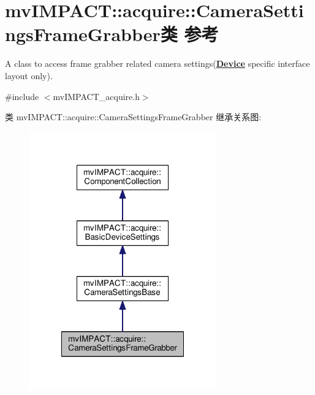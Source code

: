 \hypertarget{classmv_i_m_p_a_c_t_1_1acquire_1_1_camera_settings_frame_grabber}{\section{mv\+I\+M\+P\+A\+C\+T\+:\+:acquire\+:\+:Camera\+Settings\+Frame\+Grabber类 参考}
\label{classmv_i_m_p_a_c_t_1_1acquire_1_1_camera_settings_frame_grabber}
}


A class to access frame grabber related camera settings({\bfseries \hyperlink{classmv_i_m_p_a_c_t_1_1acquire_1_1_device}{Device}} specific interface layout only).  




{\ttfamily \#include $<$mv\+I\+M\+P\+A\+C\+T\+\_\+acquire.\+h$>$}



类 mv\+I\+M\+P\+A\+C\+T\+:\+:acquire\+:\+:Camera\+Settings\+Frame\+Grabber 继承关系图\+:
\nopagebreak
\begin{figure}[H]
\begin{center}
\leavevmode
\includegraphics[width=228pt]{classmv_i_m_p_a_c_t_1_1acquire_1_1_camera_settings_frame_grabber__inherit__graph}
\end{center}
\end{figure}


